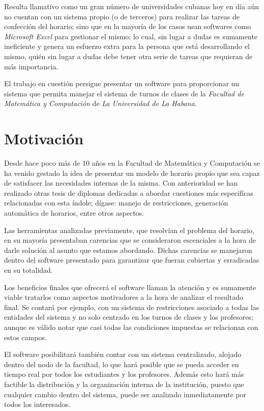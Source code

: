 \begin{introduction}
	Resulta llamativo como un gran número de universidades cubanas hoy en día aún no cuentan con un sistema propio (o de terceros) para realizar las tareas de confección del horario; sino que en la mayoría de los casos usan softwares como \textit{Microsoft Excel} para gestionar el mismo; lo cual, sin lugar a dudas es sumamente ineficiente y genera un esfuerzo extra para la persona que está desarrollando el mismo, quién sin lugar a dudas debe tener otra serie de tareas que requieran de más importancia.
	
	El trabajo en cuestión persigue presentar un software para proporcionar un sistema que permita manejar el sistema de turnos de clases de la \textit{Facultad de Matemática y Computación} de \textit{La Universidad de La Habana}.
	
	\section{Motivación}
	Desde hace poco más de 10 años en la Facultad de Matemática y Computación se ha venido gestado la idea de presentar un modelo de horario propio que sea capaz de satisfacer las necesidades internas de la misma. Con anterioridad se han realizado otras tesis de diplomas dedicadas a abordar cuestiones más especifícas relacionadas con esta índole; dígase: manejo de restricciones, generación automática de horarios, entre otros aspectos. 
	
	Las herramientas analizadas previamente, que resolvían el problema del horario, en su mayoría presentaban carencias que se consideraron escenciales a la hora de darle solución al asunto que estamos abordando. Dichas carencias se manejaron dentro del software presentado para garantizar que fueran cubiertas y erradicadas en su totalidad.
	
	Los beneficios finales que ofrecerá el software llaman la atención y es sumamente viable tratarlos como aspectos motivadores a la hora de analizar el resultado final. Se contará por ejemplo, con un sistema de restricciones asociado a todas las entidades del sistema y no solo centrado en los turnos de clases y los profesores; aunque es válido notar que casi todas las condiciones impuestas se relacionan con estos campos. 
	
	El software posibilitará también contar con un sistema centralizado, alojado dentro del nodo de la facultad, lo que hará posible que se pueda acceder en tiempo real por todos los estudiantes y los profesores. Además esto hará más factible la distribución y la organización interna de la institución, puesto que cualquier cambio dentro del sistema, puede ser analizado inmediatamente por todos los interesados.
	

\end{introduction}
